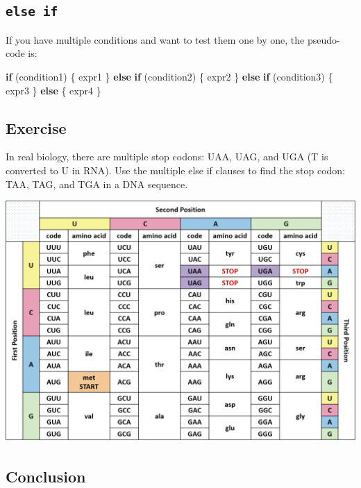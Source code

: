 \documentclass[
]{book}
\newenvironment{Shaded}{\begin{snugshade}}{\end{snugshade}}
\newcommand{\ControlFlowTok}[1]{\textcolor[rgb]{0.13,0.29,0.53}{\textbf{#1}}}
\newcommand{\NormalTok}[1]{#1}
\begin{document}
\hypertarget{else-if}{%
\subsection{\texorpdfstring{\texttt{else\ if}}{else if}}\label{else-if}}

If you have multiple conditions and want to test them one by one, the pseudo-code is:

\begin{Shaded}
\begin{Highlighting}[]
\ControlFlowTok{if}\NormalTok{ (condition1) \{ }
\NormalTok{    expr1}
\NormalTok{    \} }\ControlFlowTok{else} \ControlFlowTok{if}\NormalTok{ (condition2) \{}
\NormalTok{    expr2}
\NormalTok{    \} }\ControlFlowTok{else} \ControlFlowTok{if}\NormalTok{  (condition3) \{}
\NormalTok{    expr3}
\NormalTok{    \} }\ControlFlowTok{else}\NormalTok{ \{}
\NormalTok{    expr4}
\NormalTok{\}}
\end{Highlighting}
\end{Shaded}

\hypertarget{exercise}{%
\subsection{Exercise}\label{exercise}}

In real biology, there are multiple stop codons: UAA, UAG, and UGA (T is converted to U in RNA). Use the multiple else if clauses to find the stop codon: TAA, TAG, and TGA in a DNA sequence.

\includegraphics{images/codon.png}

\hypertarget{conclusion-6}{%
\subsection{Conclusion}\label{conclusion-6}}
\end{document}

